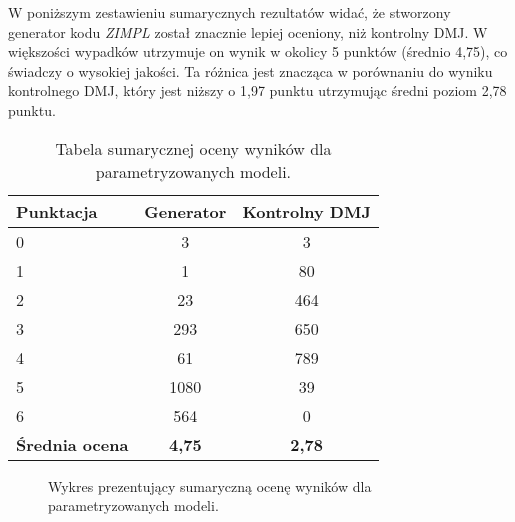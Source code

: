 W poniższym zestawieniu sumarycznych rezultatów widać, że stworzony generator kodu  \textit{ZIMPL} został znacznie lepiej oceniony, niż kontrolny DMJ. W większości wypadków utrzymuje on wynik w okolicy 5 punktów (średnio 4,75), co świadczy o wysokiej jakości. Ta różnica jest znacząca w porównaniu do wyniku kontrolnego DMJ, który jest niższy o 1,97 punktu utrzymując średni poziom 2,78 punktu.

\begin{table}[H]
\caption{Tabela sumarycznej oceny wyników dla parametryzowanych modeli.}\label{tab:tabela23}
\centering%
\begin{tabular}{|l|c|c|}
\hline
\textbf{Punktacja} & \textbf{Generator} & \textbf{Kontrolny DMJ}\\
\hline
0 & 3 & 3 \\
\hline
1 & 1 & 80 \\
\hline
2 & 23 & 464 \\
\hline
3 & 293 & 650 \\
\hline
4 & 61 & 789 \\
\hline
5 & 1080 & 39 \\
\hline
6 & 564 & 0 \\
\hline
\textbf{Średnia ocena} & \textbf{4,75} & \textbf{2,78} \\
\hline
\end{tabular}
\end{table}

\begin{figure}[H]
\centering
\begin{minipage}{0.45\textwidth}
\centering
{}
\end{minipage}%
\hspace{0.05\textwidth}
\begin{minipage}{0.45\textwidth}
\centering
{}
\end{minipage}
\caption{Wykres prezentujący sumaryczną ocenę wyników dla parametryzowanych modeli.}
\end{figure}